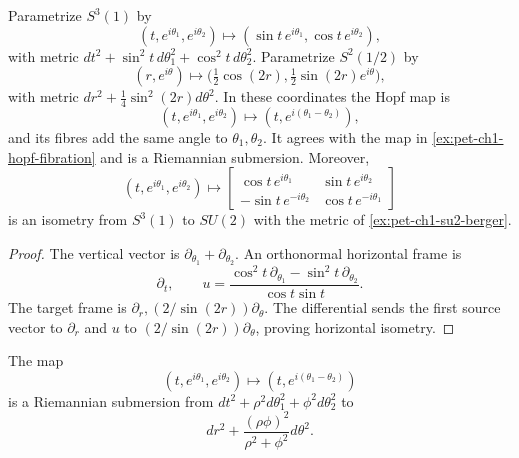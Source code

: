 \begin{example}
  \label{ex:pet-ch1-hopf-revisited}
  \leanok
  Parametrize $S^3(1)$ by
  \[
    (t,e^{i\theta_1},e^{i\theta_2})
      \longmapsto(\sin t\,e^{i\theta_1},\cos t\,e^{i\theta_2}),
  \]
  with metric
  $dt^2+\sin^2t\,d\theta_1^2+\cos^2t\,d\theta_2^2$. Parametrize
  $S^2(1/2)$ by
  \[
    (r,e^{i\theta})\longmapsto
      \big(\tfrac12\cos(2r),\tfrac12\sin(2r)e^{i\theta}\big),
  \]
  with metric $dr^2+\tfrac14\sin^2(2r)d\theta^2$. In these coordinates the
  Hopf map is
  \[
    (t,e^{i\theta_1},e^{i\theta_2})
      \longmapsto(t,e^{i(\theta_1-\theta_2)}),
  \]
  and its fibres add the same angle to $\theta_1,\theta_2$. It agrees with the
  map in \cref{ex:pet-ch1-hopf-fibration} and is a Riemannian submersion.
  Moreover,
  \[
    (t,e^{i\theta_1},e^{i\theta_2})\longmapsto
    \left[\begin{smallmatrix}
      \cos t\,e^{i\theta_1}&\sin t\,e^{i\theta_2}\\
      -\sin t\,e^{-i\theta_2}&\cos t\,e^{-i\theta_1}
    \end{smallmatrix}\right]
  \]
  is an isometry from $S^3(1)$ to $SU(2)$ with the metric of
  \cref{ex:pet-ch1-su2-berger}.
\end{example}
\begin{proof}
  \leanok
  \sketch
  The vertical vector is $\partial_{\theta_1}+\partial_{\theta_2}$. An
  orthonormal horizontal frame is
  \[
    \partial_t,\qquad
    u=\frac{\cos^2t\,\partial_{\theta_1}
              -\sin^2t\,\partial_{\theta_2}}{\cos t\sin t}.
  \]
  The target frame is
  $\partial_r,(2/\sin(2r))\partial_\theta$. The differential sends the first
  source vector to $\partial_r$ and $u$ to
  $(2/\sin(2r))\partial_\theta$, proving horizontal isometry.
\end{proof}

\begin{example}
  \label{ex:pet-ch1-hopf-general-submersion}
  \leanok
  The map
  \[
    (t,e^{i\theta_1},e^{i\theta_2})
      \longmapsto(t,e^{i(\theta_1-\theta_2)})
  \]
  is a Riemannian submersion from
  $dt^2+\rho^2d\theta_1^2+\phi^2d\theta_2^2$ to
  \[
    dr^2+\frac{(\rho\phi)^2}{\rho^2+\phi^2}d\theta^2.
  \]
\end{example}

